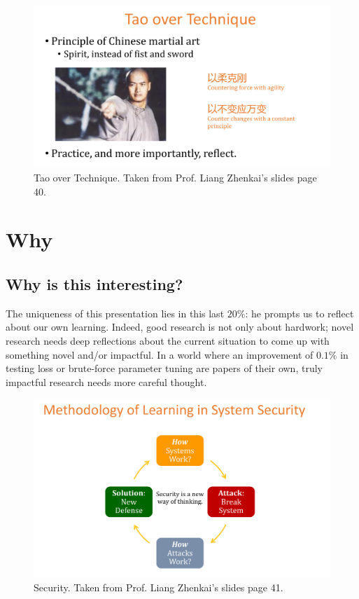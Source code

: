 \documentclass[12pt]{article}
\theoremstyle{plain}
\begin{document}
\begin{figure}[ht]
  \centering
  \includegraphics[width=\textwidth]{jet-li.png}
  \caption{\label{fig:jet-li} Tao over Technique. Taken from Prof. Liang
    Zhenkai's slides page 40.}
\end{figure}


\section{Why}
\subsection{Why is this interesting?}
\label{subsec:interesting}
The uniqueness of this presentation lies in this last $20\%$: he prompts us to
reflect about our own learning. Indeed, good research is not only about
hardwork; novel research needs deep reflections about the current situation to
come up with something novel and/or impactful. In a world where an improvement
of $0.1\%$ in testing loss or brute-force parameter tuning are papers of their
own, truly impactful research needs more careful thought.

\begin{figure}[ht]
  \centering
  \includegraphics[width=\textwidth]{security.png}
  \caption{\label{fig:security} Security. Taken from Prof. Liang Zhenkai's
    slides page 41.}
\end{figure}
\end{document}
